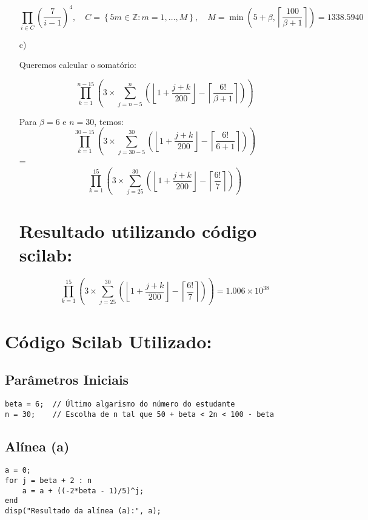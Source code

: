 \begin{enumerate}
\[
\prod_{i \in C} \left( \frac{7}{i - 1} \right)^4, \quad C = \left\{ 5m \in \mathbb{Z}: m = 1, \dots, M \right\}, \quad M = \min \left( 5 + \beta, \left\lceil \frac{100}{\beta + 1} \right\rceil \right) = 1338.5940
\]
 



      \item[c)]

    Queremos calcular o somatório:

      \[
\prod_{k=1}^{n-15} \left( 3 \times \sum_{j=n-5}^{n} \left( \left\lfloor 1 + \frac{j + k}{200} \right\rfloor - \left\lceil \frac{6!}{\beta + 1} \right\rceil \right) \right)
\]

    Para \(\beta = 6\) e \(n = 30\), temos:
  \[
\prod_{k=1}^{30-15} \left( 3 \times \sum_{j=30-5}^{30} \left( \left\lfloor 1 + \frac{j + k}{200} \right\rfloor - \left\lceil \frac{6!}{6 + 1} \right\rceil \right) \right)
\]
 = \[
\prod_{k=1}^{15} \left( 3 \times \sum_{j=25}^{30} \left( \left\lfloor 1 + \frac{j + k}{200} \right\rfloor - \left\lceil \frac{6!}{7} \right\rceil \right) \right)
\]

\section*{Resultado utilizando  código scilab:}
\[
\prod_{k=1}^{15} \left( 3 \times \sum_{j=25}^{30} \left( \left\lfloor 1 + \frac{j + k}{200} \right\rfloor - \left\lceil \frac{6!}{7} \right\rceil \right) \right) =  1.006 \times 10^{38}
\] 



    
\end{enumerate}


\section*{Código Scilab Utilizado:}

\subsection*{Parâmetros Iniciais}
\begin{verbatim}
beta = 6;  // Último algarismo do número do estudante
n = 30;    // Escolha de n tal que 50 + beta < 2n < 100 - beta
\end{verbatim}

\subsection*{Alínea (a)}
\begin{verbatim}
a = 0;
for j = beta + 2 : n
    a = a + ((-2*beta - 1)/5)^j;
end
disp("Resultado da alínea (a):", a);
\end{verbatim}

